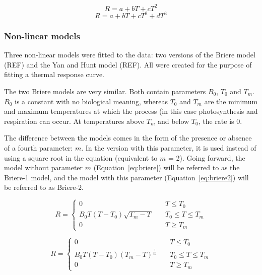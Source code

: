 \documentclass[11pt, a4paper]{article}
\begin{document}
	\begin{equation} \label{eq:quad}
	R = a + bT + cT^2
	\end{equation}
	\begin{equation} \label{eq:cubic}
	R = a + bT + cT^2 + dT^3
	\end{equation}
	
	\subsubsection*{Non-linear models}
	Three non-linear models were fitted to the data: two versions of the Briere model (REF) and the Yan and Hunt model (REF). All were created for the purpose of fitting a thermal response curve.
	
	The two Briere models are very similar. Both contain parameters $B_0$, $T_0$ and $T_m$. $B_0$ is a constant with no biological meaning, whereas $T_0$ and $T_m$ are the minimum and maximum temperatures at which the process (in this case photosynthesis and respiration can occur. At temperatures above $T_m$ and below $T_0$, the rate is 0.

	The difference between the models comes in the form of the presence or absence of a fourth parameter: $m$. In the version with this parameter, it is used instead of using a square root in the equation (equivalent to $m$ = 2). Going forward, the model without parameter $m$ (Equation~\ref{eq:briere}) will be referred to as the Briere-1 model, and the model with this parameter (Equation~\ref{eq:briere2}) will be referred to as Briere-2.
	
	
	\begin{equation} \label{eq:briere}
	R = \left\{
			\begin{array}{ll}
			0 & \quad T \leq T_0 \\
            B_0 T (T-T_0) \sqrt{T_m - T} & \quad T_0 \leq T \leq T_m \\
            0 & \quad T \geq T_m
			\end{array}
	\right.
	\end{equation}
	
	\begin{equation} \label{eq:briere2}
	R = \left\{
			\begin{array}{ll}
			0 & \quad T \leq T_0 \\
            B_0 T (T-T_0) (T_m-T)^\frac{1}{m} & \quad T_0 \leq T \leq T_m \\
            0 & \quad T \geq T_m
			\end{array}
	\right.
	\end{equation}
\end{document}
